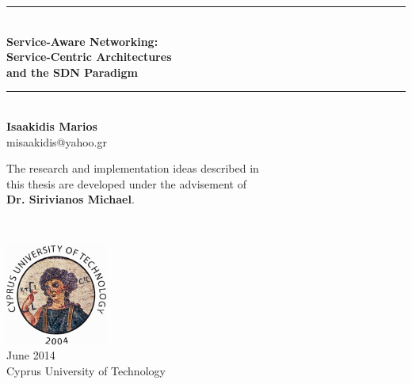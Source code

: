 \begin{titlepage}

\begin{center}

\newcommand{\HRule}{\rule{\linewidth}{0.5mm}}



\HRule \\[0.5cm]
{ \LARGE \bfseries {\huge Service-Aware Networking:} \\[0.2cm] Service-Centric Architectures\\[0.2cm]and the SDN Paradigm}\\[0.5cm]

\HRule \\[1cm]

{\LARGE \bf
Isaakidis Marios\\
}
misaakidis@yahoo.gr

\vfill

{\large
The research and implementation ideas described in\\ this thesis are developed under the advisement of\\ \textbf{Dr. Sirivianos Michael}.}
\end{center}
 ~\\[1.5cm]
\begin{flushright}
\includegraphics[width=0.25\textwidth]{./cut-logo-2}\\[0.2cm]
{\large
June 2014 \\
Cyprus University of Technology
}
\end{flushright}

\end{titlepage}